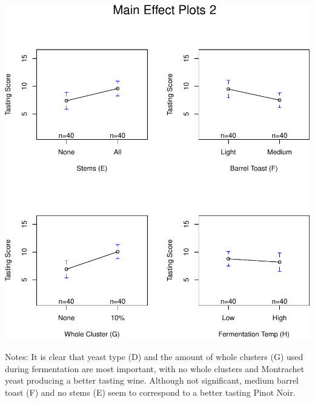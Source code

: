 \documentclass[]{article}
\begin{document}
\includegraphics{wine_tasting_files/figure-latex/unnamed-chunk-7-2.pdf}

Notes: It is clear that yeast type (D) and the amount of whole clusters
(G) used during fermentation are most important, with no whole clusters
and Montrachet yeast producing a better tasting wine. Although not
significant, medium barrel toast (F) and no stems (E) seem to correspond
to a better tasting Pinot Noir.

\newpage
\end{document}
